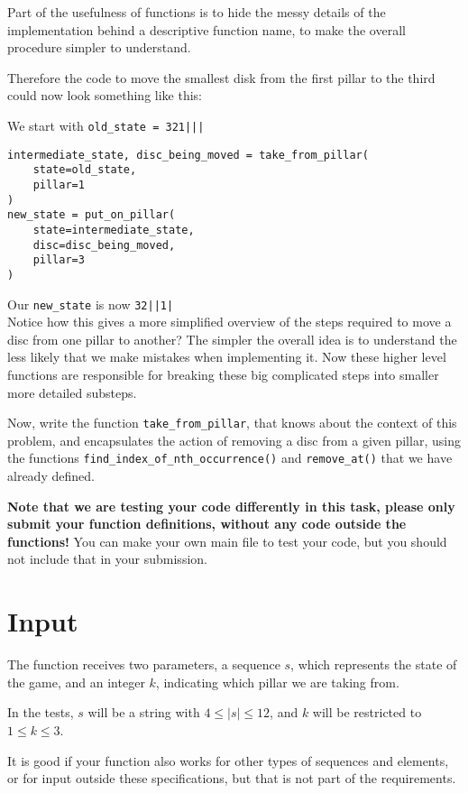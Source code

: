 
Part of the usefulness of functions is to hide the messy details of the implementation behind a descriptive function name,
to make the overall procedure simpler to understand.

Therefore the code to move the smallest disk from the first pillar to the third
could now look something like this:

We start with \texttt{old\_state = 321|||}
\begin{verbatim}
intermediate_state, disc_being_moved = take_from_pillar(
    state=old_state,
    pillar=1
)
new_state = put_on_pillar(
    state=intermediate_state,
    disc=disc_being_moved,
    pillar=3
)
\end{verbatim}
Our \texttt{new\_state} is now \texttt{32||1|}\\

Notice how this gives a more simplified overview
of the steps required to move a disc from one pillar to another?
The simpler the overall idea is to understand 
the less likely that we make mistakes when implementing it.
Now these higher level functions are responsible
for breaking these big complicated steps into smaller more detailed substeps.

Now, write the function \texttt{take\_from\_pillar},
that knows about the context of this problem,
and encapsulates the action of removing a disc from a given pillar,
using the functions \texttt{find\_index\_of\_nth\_occurrence()}
and \texttt{remove\_at()} that we have already defined.

\textbf{Note that we are testing your code differently in this task,
please only submit your function definitions, without any code outside the functions!}
You can make your own main file to test your code,
but you should not include that in your submission.

\section*{Input}

The function receives two parameters,
a sequence $s$, which represents the state of the game,
and an integer $k$, indicating which pillar we are taking from.

In the tests, $s$ will be a string with $4 \le |s| \le 12$,
and $k$ will be restricted to $1 \le k \le 3$.

It is good if your function also works for other types of sequences and elements,
or for input outside these specifications,
but that is not part of the requirements.

